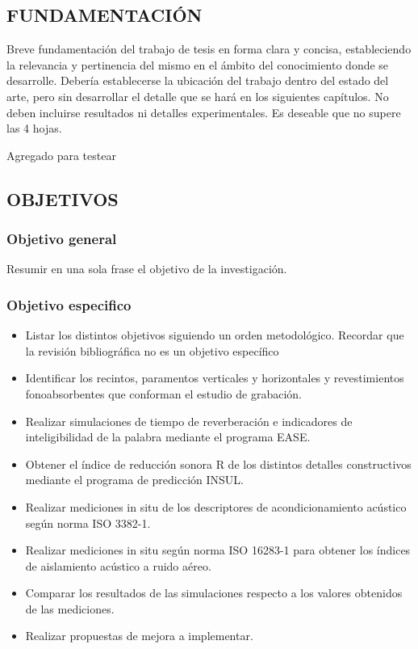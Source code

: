 \subsection{FUNDAMENTACIÓN}

Breve fundamentación del trabajo de tesis en forma clara y concisa, estableciendo la relevancia y pertinencia del mismo en el ámbito del conocimiento donde se desarrolle. Debería establecerse la ubicación del trabajo dentro del estado del arte, pero sin desarrollar el detalle que se hará en los siguientes capítulos. No deben incluirse resultados ni detalles experimentales. Es deseable que no supere las 4 hojas.

Agregado para testear

\subsection{OBJETIVOS}

\subsubsection{Objetivo general}

Resumir en una sola frase el objetivo de la investigación.

\subsubsection{Objetivo especifico}

\begin{itemize}
    \item Listar los distintos objetivos siguiendo un orden metodológico. Recordar que la revisión bibliográfica no es un objetivo específico
    \item Identificar los recintos, paramentos verticales y horizontales y revestimientos fonoabsorbentes que conforman el estudio de grabación.
    \item Realizar simulaciones de tiempo de reverberación e indicadores de inteligibilidad de la palabra mediante el programa EASE.
    \item Obtener el índice de reducción sonora R de los distintos detalles constructivos mediante el programa de predicción INSUL.
    \item 	Realizar mediciones in situ de los descriptores de acondicionamiento acústico según norma ISO 3382-1.
    \item	Realizar mediciones in situ según norma ISO 16283-1 para obtener los índices de aislamiento acústico a ruido aéreo.
    \item Comparar los resultados de las simulaciones respecto a los valores obtenidos de las mediciones.
    \item Realizar propuestas de mejora a implementar.
\end{itemize}

